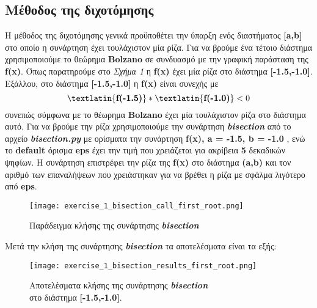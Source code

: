 \documentclass[First Project.tex]{subfiles}
\begin{document}
\subsection{ Μέθοδος της διχοτόμησης }
Η μέθοδος της διχοτόμησης γενικά προϋποθέτει την ύπαρξη ενός διαστήματος \textlatin{\textbf{[a,b]}} στο οποίο η συνάρτηση έχει τουλάχιστον μία ρίζα. Για να βρούμε ένα 
τέτοιο διάστημα χρησιμοποιούμε το θεώρημα \textlatin{\textbf{Bolzano}} σε συνδυασμό με την γραφική παράσταση της \textlatin{\textbf{f(x)}}. Όπως 
παρατηρούμε στο \textit{Σχήμα 1} η \textlatin{\textbf{f(x)}} έχει μία ρίζα στο διάστημα \textlatin{\textbf{[-1.5,-1.0]}}. Εξάλλου, στο διάστημα 
\textlatin{\textbf{[-1.5,-1.0]}} η \textlatin{\textbf{f(x)}} είναι συνεχής με \[\textlatin{\textbf{f(-1.5)}}*\textlatin{\textbf{f(-1.0)}}<0\] 
συνεπώς σύμφωνα με το θέωρημα \textlatin{\textbf{Bolzano}} έχει μία τουλάχιστον ρίζα στο διάστημα αυτό. Για να βρούμε την ρίζα χρησιμοποιούμε
την συνάρτηση \textit{\textlatin{\textbf{bisection}}} από το αρχείο \textit{\textlatin{\textbf{bisection.py}}} με ορίσματα την συνάρτηση 
\textlatin{\textbf{f(x), a = -1.5, b = -1.0 }}, ενώ το \textlatin{\textbf{default}} όρισμα \textlatin{\textbf{eps}} έχει την τιμή που
χρειάζεται για ακρίβεια \textbf{5} δεκαδικών ψηφίων. H συνάρτηση επιστρέφει την ρίζα της \textlatin{\textbf{f(x)}} στο διάστημα 
\textlatin{\textbf{(a,b)}} και τον αριθμό των επαναλήψεων που χρειάστηκαν για να βρέθει η ρίζα με σφάλμα λιγότερο από \textlatin{\textbf{eps}}.
\vspace{5px}
\begin{figure}[h!]
    \centering
    \captionsetup{justification=centering}
    \begin{center}
        \texttt{[image: exercise\_1\_bisection\_call\_first\_root.png]}    
        \caption{Παράδειγμα κλήσης της συνάρτησης \textit{\textlatin{\textbf{bisection}}}}
    \end{center}
\end{figure}

Μετά την κλήση της συνάρτησης \textit{\textlatin{\textbf{bisection}}} τα αποτελέσματα είναι τα εξής:
\begin{figure}[h!]
    \centering
    \captionsetup{justification=centering}
    \begin{center}
    \texttt{[image: exercise\_1\_bisection\_results\_first\_root.png]}    
    \caption{ Αποτελέσματα κλήσης της συνάρτησης \textit{\textlatin{\textbf{bisection}}} \\ στο διάστημα \textlatin{\textbf{[-1.5,-1.0]}}. }
    \end{center}
\end{figure}
\end{document}
